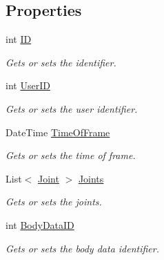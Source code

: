 \subsection*{Properties}
\begin{DoxyCompactItemize}
\item 
int \mbox{\hyperlink{class_bar_none_1_1_shared_1_1_domain_model_1_1_body_data_frame_a96f7866bfd25b0a8d819817a622cb2d1}{ID}}
\begin{DoxyCompactList}\small\item\em Gets or sets the identifier. \end{DoxyCompactList}\item 
int \mbox{\hyperlink{class_bar_none_1_1_shared_1_1_domain_model_1_1_body_data_frame_a1c8c1c8670c7d0f336b0810cdd39c572}{User\+ID}}
\begin{DoxyCompactList}\small\item\em Gets or sets the user identifier. \end{DoxyCompactList}\item 
Date\+Time \mbox{\hyperlink{class_bar_none_1_1_shared_1_1_domain_model_1_1_body_data_frame_afd3165741535fa26b014f080811ceb52}{Time\+Of\+Frame}}
\begin{DoxyCompactList}\small\item\em Gets or sets the time of frame. \end{DoxyCompactList}\item 
List$<$ \mbox{\hyperlink{class_bar_none_1_1_shared_1_1_domain_model_1_1_joint}{Joint}} $>$ \mbox{\hyperlink{class_bar_none_1_1_shared_1_1_domain_model_1_1_body_data_frame_a548ab15212963375aef6f00334528dce}{Joints}}
\begin{DoxyCompactList}\small\item\em Gets or sets the joints. \end{DoxyCompactList}\item 
int \mbox{\hyperlink{class_bar_none_1_1_shared_1_1_domain_model_1_1_body_data_frame_a911a521680018bea8aab59a9007967ef}{Body\+Data\+ID}}
\begin{DoxyCompactList}\small\item\em Gets or sets the body data identifier. \end{DoxyCompactList}\item 

\end{DoxyCompactItemize}
